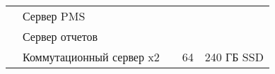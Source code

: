 \begin{small}
\begin{longtable}{|p{}                |p{}         |p{}                                                           |p{}              |p{}|}
                                  & Сервер PMS              &                                                                        &                              & \\
                                  & Сервер отчетов          &                                                                        &                              & \\
    \cline{2-2}\cline{4-5}
                                  & Коммутационный сервер x2&                                                                        & 64                           & 240 ГБ SSD \\
\end{longtable}
\end{small}

%
%
%
%
%
%
